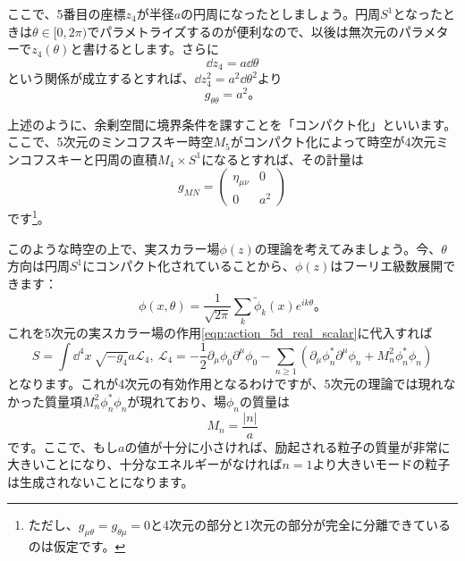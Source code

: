 \documentclass[unicode,a4paper,10pt]{ltjsarticle}
\begin{document}
ここで、5番目の座標$z_{4}$が半径$a$の円周になったとしましょう。円周$S^{1}$となったときは$\theta\in[0,2\pi)$でパラメトライズするのが便利なので、以後は無次元のパラメターで$z_{4}(\theta)$と書けるとします。さらに
\begin{equation}
   \dd z_{4}
   =
   a\dd \theta
\end{equation}
という関係が成立するとすれば、$\dd z_{4}^2=a^2\dd \theta^2$より
\begin{equation}
   g_{\theta\theta}=a^2
   。
\end{equation}

上述のように、余剰空間に境界条件を課すことを「コンパクト化」といいます。ここで、5次元のミンコフスキー時空$M_{5}$がコンパクト化によって時空が4次元ミンコフスキーと円周の直積$M_{4}\times S^{1}$になるとすれば、その計量は
\begin{equation}
   g_{MN}
   =
   \begin{pmatrix}
      \eta_{\mu\nu} & 0 \\
      0 & a^2
   \end{pmatrix}
\end{equation}
です\footnote{
   ただし、$g_{\mu\theta}=g_{\theta\mu}=0$と4次元の部分と1次元の部分が完全に分離できているのは仮定です。
}。

このような時空の上で、実スカラー場$\phi(z)$の理論を考えてみましょう。今、$\theta$方向は円周$S^{1}$にコンパクト化されていることから、$\phi(z)$はフーリエ級数展開できます：
\begin{equation}
   \phi(x,\theta)
   =
   \frac{1}{\sqrt{2\pi}}
   \sum_{k}\tilde{\phi}_{k}(x)e^{ik\theta}
   。
\end{equation}
これを5次元の実スカラー場の作用\eqref{eqn:action_5d_real_scalar}に代入すれば
\begin{equation}
   S
   =
   \int\dd^4x\ 
   \sqrt{-g_{4}}a\mathcal{L}_{4}
   ,\ 
   \mathcal{L}_{4}
   =
   -
   \frac{1}{2}\partial_{\mu}\phi_{0}\partial^{\mu}\phi_{0}
   -
   \sum_{n\geq 1}
   \left(  
      \partial_{\mu}\phi^{\ast}_{n}\partial^{\mu}\phi_{n}
      +
      M_{n}^2 \phi_{n}^{\ast}\phi_{n}
   \right)
\end{equation}
となります。これが4次元の有効作用となるわけですが、5次元の理論では現れなかった質量項$M_{n}^2 \phi_{n}^{\ast}\phi_{n}$が現れており、場$\phi_{n}$の質量は
\begin{equation}
   M_{n}
   =
   \frac{|n|}{a}
\end{equation}
です。ここで、もし$a$の値が十分に小さければ、励起される粒子の質量が非常に大きいことになり、十分なエネルギーがなければ$n=1$より大きいモードの粒子は生成されないことになります。
\end{document}
